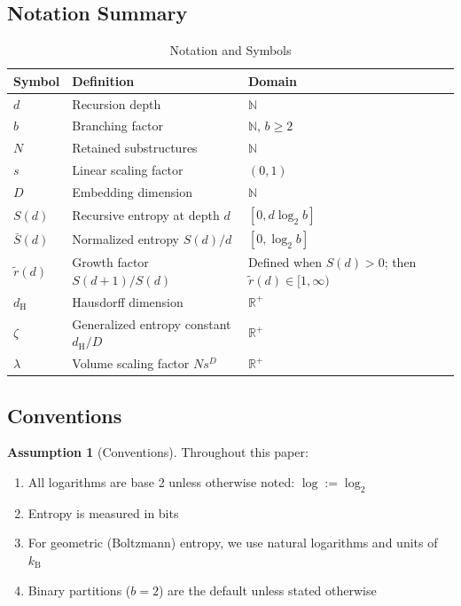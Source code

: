 \documentclass[11pt,a4paper]{article}
\theoremstyle{definition}
\newtheorem{assumption}[theorem]{Assumption}
\theoremstyle{remark}
\newcommand{\R}{\mathbb{R}}
\newcommand{\N}{\mathbb{N}}
\newcommand{\kB}{k_{\mathrm{B}}}
\newcommand{\dH}{d_{\mathrm{H}}}
\newcommand{\Sbar}{\bar{S}}
\newcommand{\rtilde}{\tilde{r}}
\begin{document}
\subsection{Notation Summary}

\begin{table}[H]
\centering
\caption{Notation and Symbols}
\label{tab:notation}
\begin{tabular}{@{}lll@{}}
\toprule
\textbf{Symbol} & \textbf{Definition} & \textbf{Domain} \\
\midrule
$d$ & Recursion depth & $\N$ \\
$b$ & Branching factor & $\N$, $b \geq 2$ \\
$N$ & Retained substructures & $\N$ \\
$s$ & Linear scaling factor & $(0,1)$ \\
$D$ & Embedding dimension & $\N$ \\
$S(d)$ & Recursive entropy at depth $d$ & $[0, d\log_2 b]$ \\
$\Sbar(d)$ & Normalized entropy $S(d)/d$ & $[0, \log_2 b]$ \\
$\rtilde(d)$ & Growth factor $S(d+1)/S(d)$ & Defined when $S(d)>0$; then $\rtilde(d)\in[1,\infty)$ \\
$\dH$ & Hausdorff dimension & $\R^+$ \\
$\zeta$ & Generalized entropy constant $\dH/D$ & $\R^+$ \\
$\lambda$ & Volume scaling factor $Ns^D$ & $\R^+$ \\
\bottomrule
\end{tabular}
\end{table}

\subsection{Conventions}

\begin{assumption}[Conventions]
\label{ass:conventions}
Throughout this paper:
\begin{enumerate}[nosep]
    \item All logarithms are base 2 unless otherwise noted: $\log := \log_2$
    \item Entropy is measured in bits
    \item For geometric (Boltzmann) entropy, we use natural logarithms and units of $\kB$
    \item Binary partitions ($b = 2$) are the default unless stated otherwise
\end{enumerate}
\end{assumption}
\end{document}
